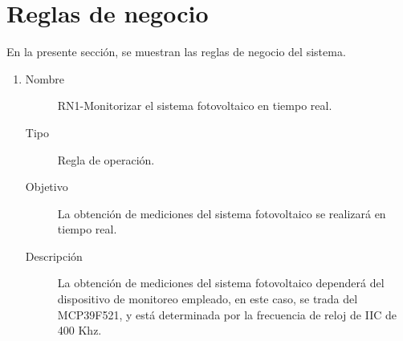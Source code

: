 \section{Reglas de negocio}
En la presente sección, se muestran las reglas de negocio del sistema.
\begin{enumerate}[label=RN\arabic*.]
    \item \label{RN1}
		\begin{description}
			\item[Nombre] RN1-Monitorizar el sistema fotovoltaico en tiempo real.
			\item[Tipo] Regla de operación.
			\item[Objetivo] La obtención de mediciones del sistema fotovoltaico se realizará en tiempo real.
			\item[Descripción] La obtención de mediciones del sistema fotovoltaico dependerá del dispositivo de monitoreo empleado, en este caso, se trada del MCP39F521, y está determinada por la frecuencia de reloj de IIC de 400 Khz. 
    		\end{description}
    		

\end{enumerate}
